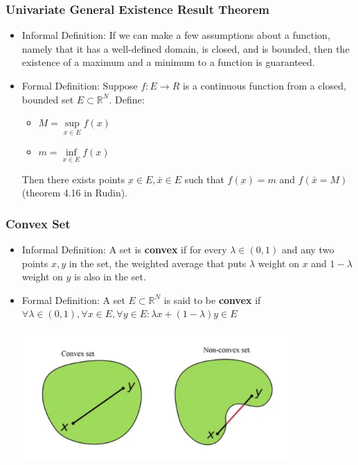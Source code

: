 \documentclass{article}
\begin{document}
\subsubsection{Univariate General Existence Result Theorem}
\begin{itemize}
    \item Informal Definition: If we can make a few assumptions about a function,
    namely that it has a well-defined domain, is closed, and is bounded, then 
    the existence of a maximum and a minimum to a function is guaranteed.
    \item Formal Definition: Suppose $ f: E \rightarrow R $ is a continuous
    function from a closed, bounded set $ E \subset \mathbb{R}^N $. Define:
    \begin{itemize}
        \item $ M = \underset{x \in E}{\sup} f(x) $
        \item $ m = \underset{x \in E}{\inf} f(x) $
    \end{itemize}
    Then there exists points $ \underbar{x} \in E, \bar{x} \in E $ such that 
    $ f(\underbar{x}) = m $ and $ f(\bar{x} = M) $ (theorem 4.16 in Rudin).
\end{itemize}

\subsubsection{Convex Set}
\begin{itemize}
    \item Informal Definition: A set is \textbf{convex} if for every $ \lambda \in (0,1) $
    and any two points $ x, y $ in the set, the weighted average that puts
    $ \lambda $ weight on $ x $ and $ 1 - \lambda $ weight on $ y $ is also in 
    the set. 
    \item Formal Definition: A set $ E \subset \mathbb{R}^N $ is said to be 
    \textbf{convex} if $ \forall \lambda \in (0,1), \forall x \in E, \forall y
    \in E: \lambda x + (1 - \lambda)y \in E $
    \begin{center}
        \includegraphics[width=0.8\textwidth]{imgs/convex.png} \\
    \end{center}
\end{itemize}
\end{document}
